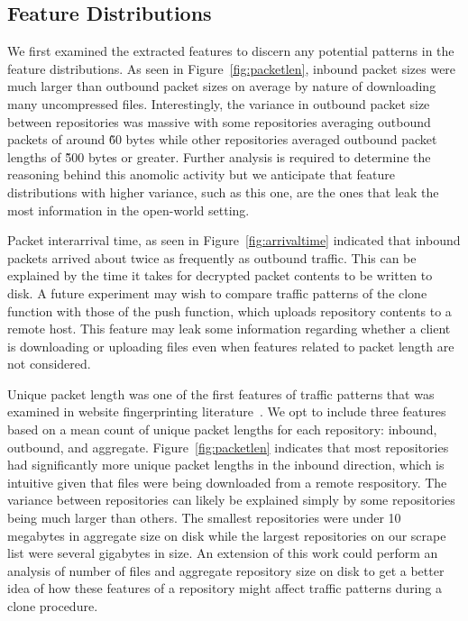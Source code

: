 \documentclass[sigconf,authorversion,nonacm]{acmart}
\begin{document}
\subsection{Feature Distributions}
We first examined the extracted features to discern any potential patterns in the feature distributions. As seen in Figure~\ref{fig:packetlen}, inbound packet sizes were much larger than outbound packet sizes on average by nature of downloading many uncompressed files. Interestingly, the variance in outbound packet size between repositories was massive with some repositories averaging outbound packets of around \~60 bytes while other repositories averaged outbound packet lengths of \~500 bytes or greater. Further analysis is required to determine the reasoning behind this anomolic activity but we anticipate that feature distributions with higher variance, such as this one, are the ones that leak the most information in the open-world setting.

Packet interarrival time, as seen in Figure~\ref{fig:arrivaltime} indicated that inbound packets arrived about twice as frequently as outbound traffic. This can be explained by the time it takes for decrypted packet contents to be written to disk. A future experiment may wish to compare traffic patterns of the clone function with those of the push function, which uploads repository contents to a remote host. This feature may leak some information regarding whether a client is downloading or uploading files even when features related to packet length are not considered.

Unique packet length was one of the first features of traffic patterns that was examined in website fingerprinting literature~\citep{herrmann2009website}. We opt to include three features based on a mean count of unique packet lengths for each repository: inbound, outbound, and aggregate. Figure~\ref{fig:packetlen} indicates that most repositories had significantly more unique packet lengths in the inbound direction, which is intuitive given that files were being downloaded from a remote respository. The variance between repositories can likely be explained simply by some repositories being much larger than others. The smallest repositories were under 10 megabytes in aggregate size on disk while the largest repositories on our scrape list were several gigabytes in size. An extension of this work could perform an analysis of number of files and aggregate repository size on disk to get a better idea of how these features of a repository might affect traffic patterns during a clone procedure.
\end{document}
